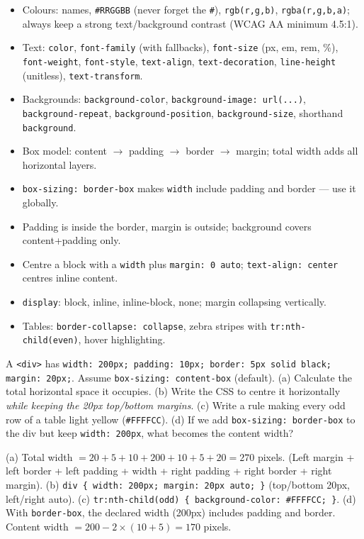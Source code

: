 \documentclass[11pt]{article}
\begin{document}
\begin{aretenir}
\begin{itemize}
\item Colours: names, \texttt{\#RRGGBB} (never forget the \texttt{\#}), \texttt{rgb(r,g,b)}, \texttt{rgba(r,g,b,a)}; always keep a strong text/background contrast (WCAG AA minimum 4.5:1).
\item Text: \texttt{color}, \texttt{font-family} (with fallbacks), \texttt{font-size} (px, em, rem, \%), \texttt{font-weight}, \texttt{font-style}, \texttt{text-align}, \texttt{text-decoration}, \texttt{line-height} (unitless), \texttt{text-transform}.
\item Backgrounds: \texttt{background-color}, \texttt{background-image: url(...)}, \texttt{background-repeat}, \texttt{background-position}, \texttt{background-size}, shorthand \texttt{background}.
\item Box model: content $\to$ padding $\to$ border $\to$ margin; total width adds all horizontal layers.
\item \texttt{box-sizing: border-box} makes \texttt{width} include padding and border --- use it globally.
\item Padding is inside the border, margin is outside; background covers content+padding only.
\item Centre a block with a \texttt{width} plus \texttt{margin: 0 auto}; \texttt{text-align: center} centres inline content.
\item \texttt{display}: block, inline, inline-block, none; margin collapsing vertically.
\item Tables: \texttt{border-collapse: collapse}, zebra stripes with \texttt{tr:nth-child(even)}, hover highlighting.
\end{itemize}
\end{aretenir}

\begin{exercice}[Practice]
A \texttt{<div>} has \texttt{width: 200px; padding: 10px; border: 5px solid black; margin: 20px;}. Assume \texttt{box-sizing: content-box} (default).
(a) Calculate the total horizontal space it occupies.
(b) Write the CSS to centre it horizontally \emph{while keeping the 20px top/bottom margins}.
(c) Write a rule making every odd row of a table light yellow (\texttt{\#FFFFCC}).
(d) If we add \texttt{box-sizing: border-box} to the div but keep \texttt{width: 200px}, what becomes the content width?
\end{exercice}

\begin{corrige}[Exercise 1]
(a) Total width $= 20 + 5 + 10 + 200 + 10 + 5 + 20 = 270$ pixels. (Left margin + left border + left padding + width + right padding + right border + right margin).
(b) \texttt{div \{ width: 200px; margin: 20px auto; \}} (top/bottom 20px, left/right auto).
(c) \texttt{tr:nth-child(odd) \{ background-color: \#FFFFCC; \}}.
(d) With \texttt{border-box}, the declared width (200px) includes padding and border. Content width $= 200 - 2\times(10+5) = 170$ pixels.
\end{corrige}
\end{document}
